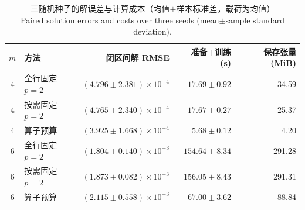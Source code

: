 \begin{table}[H]
\centering
\caption{三随机种子的解误差与计算成本（均值$\pm$样本标准差，载荷为均值）\\Paired solution errors and costs over three seeds (mean$\pm$sample standard deviation).}
\label{tab:operator-budget-seeds}
\small
\begin{tabular}{clrrr}
\toprule
$m$ & 方法 & 闭区间解 RMSE & 准备+训练 (s) & 保存张量 (MiB) \\
\midrule
4 & 全行固定 $p=2$ & $(4.796\pm2.381)\times10^{-4}$ & $17.69\pm0.92$ & 34.59 \\
4 & 按需固定 $p=2$ & $(4.765\pm2.340)\times10^{-4}$ & $17.67\pm0.27$ & 25.37 \\
4 & 算子预算 & $(3.925\pm1.668)\times10^{-4}$ & $5.68\pm0.12$ & 4.20 \\
6 & 全行固定 $p=2$ & $(1.804\pm0.140)\times10^{-3}$ & $154.64\pm8.34$ & 291.28 \\
6 & 按需固定 $p=2$ & $(1.873\pm0.082)\times10^{-3}$ & $156.05\pm8.43$ & 291.31 \\
6 & 算子预算 & $(2.115\pm0.558)\times10^{-3}$ & $67.00\pm3.62$ & 88.84 \\
\bottomrule
\end{tabular}
\end{table}
